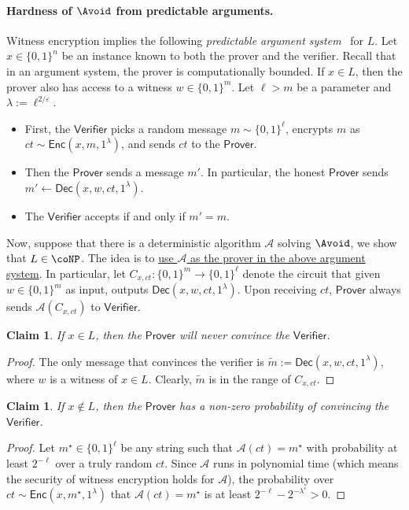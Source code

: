 \documentclass[10pt,a4paper]{article}
\newtheorem{claim}[theorem]{Claim}
\theoremstyle{definition}
\theoremstyle{remark}
\newcommand{\eps}{\varepsilon}
\newcommand{\Enc}{\mathsf{Enc}}
\newcommand{\Dec}{\mathsf{Dec}}
\newcommand{\calA}{\mathcal{A}}
\newcommand{\Prover}{\mathsf{Prover}}
\newcommand{\Verifier}{\mathsf{Verifier}}
\begin{document}
\paragraph{Hardness of $\Avoid$ from predictable arguments.} Witness encryption implies the following \emph{predictable argument system}~\cite{DBLP:conf/pkc/FaonioN017} for $L$. Let $x\in \{0, 1\}^n$ be an instance known to both the prover and the verifier. Recall that in an argument system, the prover is computationally bounded. If $x\in L$, then the prover also has access to a witness $w \in \{0, 1\}^m$. Let $\ell > m$ be a parameter and $\lambda := \ell^{2/\eps}$.
\begin{itemize}
	\item First, the $\Verifier$ picks a random message $m\sim \{0, 1\}^\ell$, encrypts $m$ as $ct \sim \Enc(x, m, 1^\lambda)$, and sends $ct$ to the $\Prover$.
	\item Then the $\Prover$ sends a message $m'$. In particular, the honest $\Prover$ sends $m' \gets \Dec(x, w, ct, 1^\lambda)$.
	\item The $\Verifier$ accepts if and only if $m' = m$.
\end{itemize}

Now, suppose that there is a deterministic algorithm $\calA$ solving $\Avoid$, we show that $L \in \coNP$. The idea is to \underline{use $\calA$ as the prover in the above argument system}. In particular, let $C_{x, ct}: \{0, 1\}^m \to \{0, 1\}^\ell$ denote the circuit that given $w\in \{0, 1\}^m$ as input, outputs $\Dec(x, w, ct, 1^\lambda)$. Upon receiving $ct$, $\Prover$ always sends $\calA(C_{x, ct})$ to $\Verifier$.

\begin{claim}
	If $x\in L$, then the $\Prover$ will never convince the $\Verifier$.
\end{claim}
\begin{proof}
	The only message that convinces the verifier is $\tilde{m} := \Dec(x, w, ct, 1^\lambda)$, where $w$ is a witness of $x\in L$. Clearly, $\tilde{m}$ is in the range of $C_{x, ct}$.
\end{proof}

\begin{claim}
	If $x\not\in L$, then the $\Prover$ has a non-zero probability of convincing the $\Verifier$.
\end{claim}
\begin{proof}
	Let $m^\star \in \{0, 1\}^\ell$ be any string such that $\calA(ct) = m^\star$ with probability at least $2^{-\ell}$ over a truly random $ct$. Since $\calA$ runs in polynomial time (which means the security of witness encryption holds for $\calA$), the probability over $ct \sim \Enc(x, m^\star, 1^\lambda)$ that $\calA(ct) = m^\star$ is at least $2^{-\ell} - 2^{-\lambda^\eps} > 0$. 
\end{proof}
\end{document}
